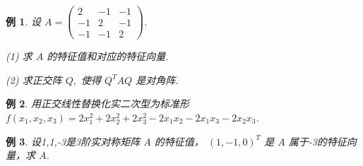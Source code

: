 \documentclass[13pt]{beamer}
\newtheorem{exa}{例}
\begin{document}
	\setcounter{exa}{0}

\begin{frame}
\begin{exa}
设 $A=\left(\begin{array}{ccc}2 & -1 & -1 \\ -1 & 2 & -1 \\ -1 & -1 & 2\end{array}\right)$.

(1) 求 $A$ 的特征值和对应的特征向量.

(2) 求正交阵 $Q,$ 使得 $Q^{T} A Q$ 是对角阵.
\end{exa}

\begin{exa}
 用正交线性替换化实二次型为标准形 $f\left(x_{1}, x_{2}, x_{3}\right)=2 x_{1}^{2}+2 x_{2}^{2}+2 x_{3}^{2}-2 x_{1} x_{2}-2 x_{1} x_{3}-2 x_{2} x_{3}$.
\end{exa}
\end{frame}

\begin{frame}
\begin{exa}
	设1,1,-3是3阶实对称矩阵 $A$ 的特征值，  $(1,-1,0)^{T}$ 是 $A$ 属于-3的特征向量，求 $A$.
\end{exa}
\end{frame}
\end{document}
